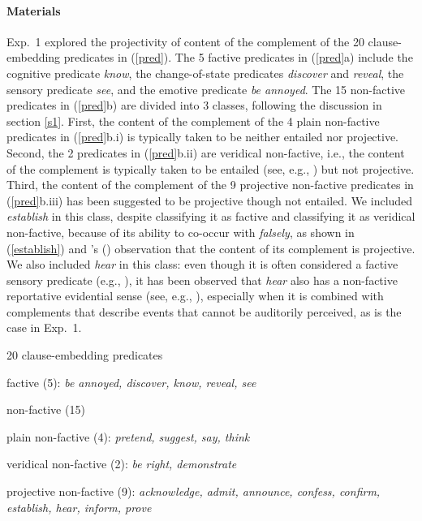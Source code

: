 \documentclass[11pt,fleqn]{article}
\newcommand{\6}{\mbox{$[\hspace*{-.6mm}[$}}
\newcommand{\9}{\mbox{$]\hspace*{-.6mm}]$}}
\newcommand{\citetpos}[1]{\citeauthor{#1}'s (\citeyear{#1})}
\begin{document}
\paragraph{Materials} Exp.~1 explored the projectivity of content of the complement of the 20 clause-embedding predicates in (\ref{pred}). The 5 factive predicates in (\ref{pred}a) include the cognitive predicate {\em know}, the change-of-state predicates {\em discover} and {\em reveal}, the sensory predicate {\em see}, and the emotive predicate {\em be annoyed}. The 15 non-factive predicates in (\ref{pred}b) are divided into 3 classes, following the discussion in section \ref{s1}. First, the content of the complement of the 4 plain non-factive predicates in (\ref{pred}b.i) is typically taken to be neither entailed nor projective. Second, the 2 predicates in  (\ref{pred}b.ii) are veridical non-factive, i.e., the content of the complement is typically taken to be entailed (see, e.g., \citealt{anand-hacquard2014}) but not projective. Third, the content of the complement of the 9 projective non-factive predicates in  (\ref{pred}b.iii)  has been suggested to be projective though not entailed. We included  {\em establish} in this class, despite \citet{wyse} classifying it as factive and \citet{swanson2012} classifying it as veridical non-factive, because of its ability to co-occur with {\em falsely}, as shown in (\ref{establish}) and \citetpos{tbd-variability} observation that the content of its complement is projective. We also included {\em hear} in this class: even though it is often considered a factive sensory predicate (e.g., \citealt{beaver-belly,anand-hacquard2014}), it has been observed that {\em hear} also has a non-factive reportative evidential sense (see, e.g., \citealt{anderson86,simons07}), especially when it is combined with complements that describe events that cannot be auditorily perceived, as is the case in Exp.~1. 


\begin{exe}
\ex\label{pred} 20 clause-embedding predicates 

\begin{xlist}

\ex factive (5): {\em be annoyed, discover, know, reveal, see}

\ex non-factive (15)

\begin{xlist}

\ex plain non-factive (4): {\em pretend, suggest, say, think}

\ex veridical non-factive (2): {\em be right, demonstrate}

\ex projective non-factive (9): {\em acknowledge, admit, announce, confess, confirm, establish, hear, inform, prove}


\end{xlist}

\end{xlist}

\end{exe}
\end{document}

